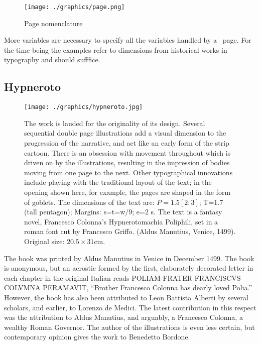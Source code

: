 \begin{figure}
  \texttt{[image: ./graphics/page.png]}
  \caption{Page nomenclature}
   \label{fig:marginfig1}
\end{figure}

More variables are necessary to specify all the variables handled by a \latex\
page. For the time being the examples refer to dimensions from historical works
in typography and should sufffice.

\subsection{Hypneroto}

\begin{figure}[htbp]
\centering
  \texttt{[image: ./graphics/hypneroto.jpg]}
\caption{The work is lauded for the originality of its
design. Several sequential double page
illustrations add a visual dimension to the
progression of the narrative, and act like an
early form of the strip cartoon. There is an
obsession with movement throughout which is driven
on by the illustrations, resulting in the
impression of bodies moving from one page to the
next. Other typographical innovations include
playing with the traditional layout of the text;
in the opening shown here, for example, the pages
are shaped in the form of goblets. The dimensions
of the text are: $P=1.5[2:3]$; T=1.7 (tall pentagon);
Margins: s=t=w/9; e=2 s. The text is a fantasy
novel, Francesco Colonna's Hypnerotomachia
Poliphili, set in a roman font cut by Francesco
Griffo. (Aldus Manutius, Venice, 1499). Original
size: $20.5\times31$\thinspace cm.}
\label{fig:hypneroto}
\end{figure}





The book was printed by Aldus Manutius in Venice in December 1499. The book is anonymous, but an acrostic formed by the first, elaborately decorated letter in each chapter in the original Italian reads \textsc{\small POLIAM FRATER FRANCISCVS COLVMNA PERAMAVIT}, \enquote{Brother Francesco Colonna has dearly loved Polia.} However, the book has also been attributed to Leon Battista Alberti by several scholars, and earlier, to Lorenzo de Medici. The latest contribution in this respect was the attribution to Aldus Manutius, and arguably, a Francesco Colonna, a wealthy Roman Governor. The author of the illustrations is even less certain, but contemporary opinion gives the work to Benedetto Bordone.




